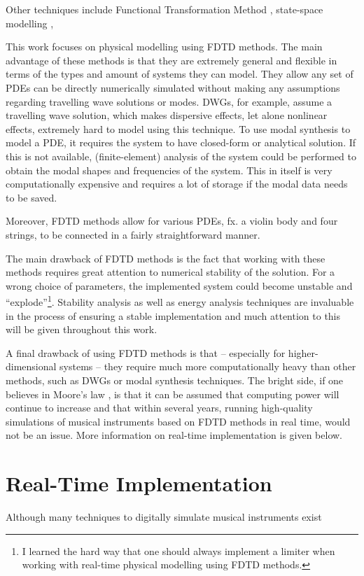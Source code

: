 Other techniques include Functional Transformation Method \cite{Trautmann2003}, state-space modelling \cite{Matignon1992},  


This work focuses on physical modelling using FDTD methods. The main advantage of these methods is that they are extremely general and flexible in terms of the types and amount of systems they can model. They allow any set of PDEs can be directly numerically simulated without making any assumptions regarding travelling wave solutions or modes. DWGs, for example, assume a travelling wave solution, which makes dispersive effects, let alone nonlinear effects, extremely hard to model using this technique. To use modal synthesis to model a PDE, it requires the system to have closed-form or analytical solution. If this is not available, (finite-element) analysis of the system could be performed to obtain the modal shapes and frequencies of the system. This in itself is very computationally expensive and requires a lot of storage if the modal data needs to be saved. 

Moreover, FDTD methods allow for various PDEs, fx. a violin body and four strings, to be connected in a fairly straightforward manner. 


The main drawback of FDTD methods is the fact that working with these methods requires great attention to numerical stability of the solution. For a wrong choice of parameters, the implemented system could become unstable and ``explode''\footnote{I learned the hard way that one should always implement a limiter when working with real-time physical modelling using FDTD methods.}. Stability analysis as well as energy analysis techniques are invaluable in the process of ensuring a stable implementation and much attention to this will be given throughout this work.

A final drawback of using FDTD methods is that -- especially for higher-dimensional systems -- they require much more computationally heavy than other methods, such as DWGs or modal synthesis techniques. The bright side, if one believes in Moore's law \cite{Moore1965}, is that it can be assumed that computing power will continue to increase and that within several years, running high-quality simulations of musical instruments based on FDTD methods in real time, would not be an issue. More information on real-time implementation is given below. 

\section{Real-Time Implementation}
Although many techniques to digitally simulate musical instruments exist

